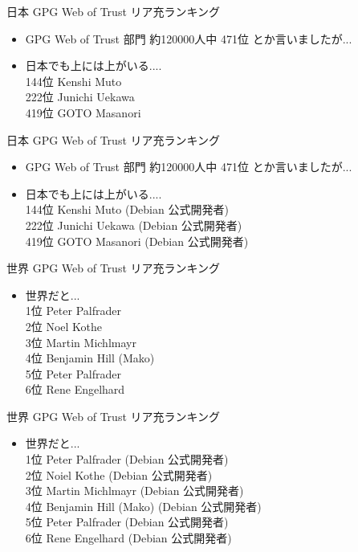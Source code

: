 \begin{frame}{日本 GPG Web of Trust リア充ランキング}
\begin{itemize}[<+->]
\item GPG Web of Trust 部門 約120000人中 471位 とか言いましたが...
\item 日本でも上には上がいる....\\
144位 Kenshi Muto \\
222位 Junichi Uekawa \\
419位 GOTO Masanori \\
\end{itemize}
\end{frame}

\begin{frame}{日本 GPG Web of Trust リア充ランキング}
\begin{itemize}
\item GPG Web of Trust 部門 約120000人中 471位 とか言いましたが...
\item 日本でも上には上がいる....\\
144位 Kenshi Muto {\color{red}(Debian 公式開発者)}\\
222位 Junichi Uekawa {\color{red}(Debian 公式開発者)}\\
419位 GOTO Masanori {\color{red}(Debian 公式開発者)}\\
\end{itemize}
\end{frame}


\begin{frame}{世界 GPG Web of Trust リア充ランキング}
\begin{itemize}[<+->]
\item 世界だと...\\
1位 Peter Palfrader \\
2位 Noel Kothe \\
3位 Martin Michlmayr \\
4位 Benjamin Hill (Mako) \\
5位 Peter Palfrader \\
6位 Rene Engelhard \\
\end{itemize}
\end{frame}

\begin{frame}{世界 GPG Web of Trust リア充ランキング}
\begin{itemize}
\item 世界だと...\\
1位 Peter Palfrader  {\color{red}(Debian 公式開発者)}\\
2位 Noiel Kothe {\color{red}(Debian 公式開発者)}\\
3位 Martin Michlmayr {\color{red}(Debian 公式開発者)}\\
4位 Benjamin Hill (Mako) {\color{red}(Debian 公式開発者)}\\
5位 Peter Palfrader {\color{red}(Debian 公式開発者)}\\
6位 Rene Engelhard {\color{red}(Debian 公式開発者)}\\
\end{itemize}
\end{frame}

